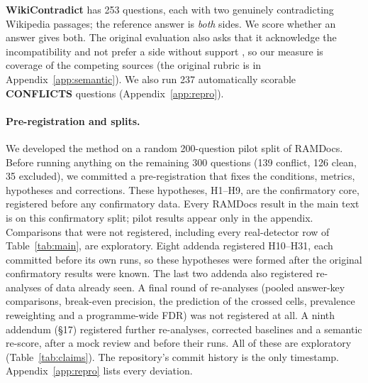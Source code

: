 \textbf{WikiContradict} \citep{hou2024wikicontradict} has 253 questions, each with two genuinely contradicting
Wikipedia passages; the reference answer is \emph{both} sides. We score whether an answer gives both. The original evaluation also asks that it acknowledge the incompatibility and not prefer a side without support \citep[\S3.4]{hou2024wikicontradict}, so our measure is coverage of the competing sources (the original rubric is in Appendix~\ref{app:semantic}). We also run 237 automatically scorable
\textbf{CONFLICTS} \citep{cattan2025conflicts} questions (Appendix~\ref{app:repro}).

\paragraph{Pre-registration and splits.}
We developed the method on a random 200-question pilot split of RAMDocs. Before running anything on the remaining 300
questions (139 conflict, 126 clean, 35 excluded), we committed a pre-registration that fixes the conditions, metrics,
hypotheses and corrections. These hypotheses, H1--H9, are the confirmatory core, registered before any confirmatory
data. Every RAMDocs result in the main text is on this confirmatory split; pilot results appear only in the appendix.
Comparisons that were not registered, including every real-detector row of Table~\ref{tab:main}, are exploratory.
Eight addenda registered H10--H31, each committed before its own runs, so these hypotheses were formed after the
original confirmatory results were known. The last two addenda also registered re-analyses of data already
seen. A final round of re-analyses (pooled answer-key comparisons, break-even precision, the prediction of the crossed
cells, prevalence reweighting and a programme-wide FDR) was not registered at all. A ninth addendum (\S17) registered
further re-analyses, corrected baselines and a semantic re-score, after a mock review and before their runs. All of
these are exploratory (Table~\ref{tab:claims}). The repository's commit history is the only timestamp. Appendix~\ref{app:repro} lists every deviation.

